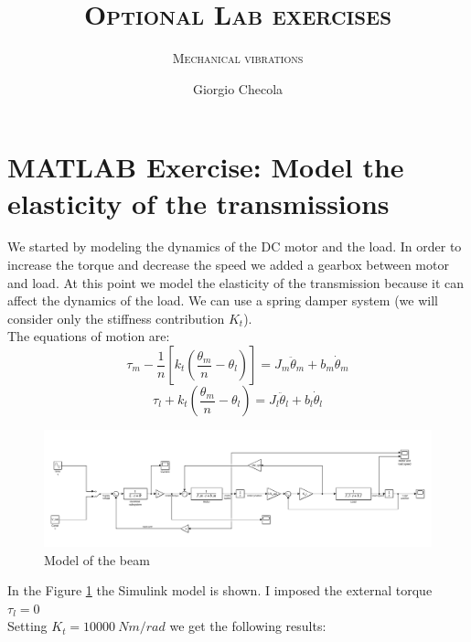 \documentclass[11pt,a4paper]{article}
\title{\textsc{Optional Lab exercises}}
\subtitle{\textsc{Mechanical vibrations}}
\author{Giorgio Checola}
\begin{document}
\graphicspath{ {./images/} }
\maketitle
\thispagestyle{empty}
\newpage
\thispagestyle{empty}
\mbox{}
\newpage


\section{MATLAB Exercise: Model the elasticity of the transmissions}
We started by modeling the dynamics of the DC motor and the load. In order to increase the torque and decrease the speed we added a gearbox between motor and load. At this point we model the elasticity of the transmission because it can affect the dynamics of the load. We can use a spring damper system (we will consider only the stiffness contribution $K_t$).\\
The equations of motion are:
\begin{equation*}
\tau_m - \frac{1}{n}\left[k_t\left(\frac{\theta_m}{n}-\theta_l\right)\right]=J_m\ddot{\theta}_m+b_m\dot{\theta}_m
\end{equation*}
\begin{equation*}
\tau_l + k_t\left(\frac{\theta_m}{n}-\theta_l\right)=J_l\ddot{\theta}_l+b_l\dot{\theta}_l
\end{equation*}
\begin{figure}[H]
	\centering
	\includegraphics[width=150mm]{images/schema.png}
	\caption{Model of the beam}
	\label{scheme}
\end{figure}
In the Figure \ref{scheme} the Simulink model is shown. I imposed the external torque $\tau_l=0$ \\
Setting $K_t=10000~Nm/rad$ we get the following results:
\end{document}
